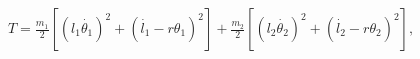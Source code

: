 \documentclass[convert={outfile=\jobname.svg}]{standalone}
\begin{document}
$
    \displaystyle
    T = \frac{m_1}{2}\left[\left(l_1\dot{\theta_1}\right)^2 + \left(\dot{l_1} - r\theta_1\right)^2\right] +
        \frac{m_2}{2}\left[\left(l_2\dot{\theta_2}\right)^2 + \left(\dot{l_2} - r\theta_2\right)^2\right],
$
\end{document}

